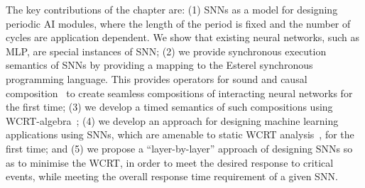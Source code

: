 The key contributions of the chapter are: (1) \acfp{SNN} as a model for designing periodic 
AI modules, where the length of the period is fixed and the number of cycles are application dependent.
We show that existing neural networks, such as \ac{MLP}, are special instances of \ac{SNN};
(2) we provide synchronous execution semantics of \acp{SNN} by providing a mapping to the 
Esterel synchronous programming language. This provides operators for sound and causal composition~\cite{benveniste2003synchronous} to 
create seamless compositions of interacting neural networks for the first time; (3) we develop a 
timed semantics of such compositions using \ac{WCRT}-algebra~\cite{wang2017timing}; (4) we
 develop an approach for designing machine learning applications using \acp{SNN}, which are amenable to
  static \acf{WCRT} analysis~\cite{roop2009tight}, for the first time; and (5) we propose a ``layer-by-layer'' approach of 
 designing \acp{SNN} so as to minimise the \ac{WCRT}, in order to meet the desired response to 
critical events, while meeting the overall response time requirement of a given \ac{SNN}. 



